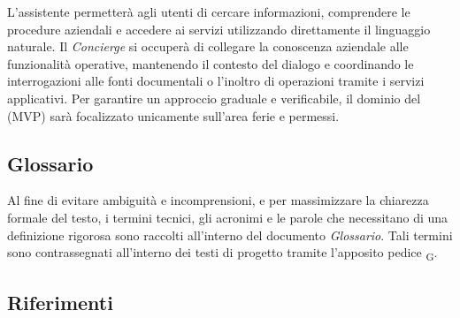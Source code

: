\documentclass[documento]{gpt}
\begin{document}
L'assistente permetterà agli utenti di cercare informazioni, comprendere le procedure aziendali e accedere ai servizi utilizzando direttamente il linguaggio naturale. Il \textit{Concierge} si occuperà di collegare la conoscenza aziendale alle funzionalità operative, mantenendo il contesto del dialogo e coordinando le interrogazioni alle fonti documentali o l'inoltro di operazioni tramite i servizi applicativi.
Per garantire un approccio graduale e verificabile, il dominio del  (MVP) sarà focalizzato unicamente sull'area ferie e permessi.

\subsection{Glossario}
Al fine di evitare ambiguità e incomprensioni, e per massimizzare la chiarezza formale del testo, i termini tecnici, gli acronimi e le parole che necessitano di una definizione rigorosa sono raccolti all'interno del documento \textit{Glossario}. Tali termini sono contrassegnati all'interno dei testi di progetto tramite l'apposito pedice \textsubscript{G}.  


\subsection{Riferimenti}

\end{document}
